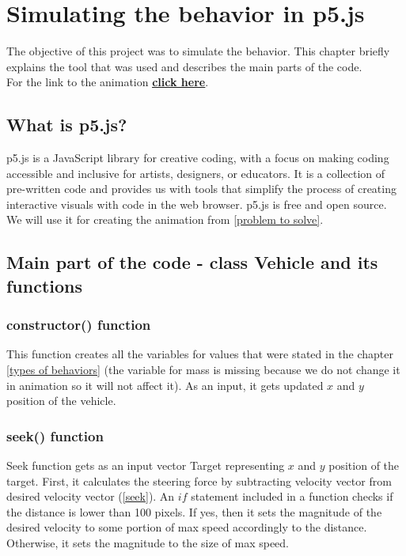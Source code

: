 \documentclass[10pt,twoside,english,a4paper]{article}
\begin{document}
\section{Simulating the behavior in p5.js} \label{simulation} 

The objective of this project was to simulate the behavior. This chapter briefly
explains the tool that was used and describes the main parts of the code.\\
For the link to the animation \textbf{\underline{\href{https://editor.p5js.org/RichardCernansky/sketches/E0zAXshWw}{click here}}}.

\subsection{What is p5.js?} \label{p5 char} 

p5.js is a JavaScript library for creative coding, with a focus on 
making coding accessible and inclusive for artists, designers, or 
educators. It is a collection of pre-written code and provides us 
with tools that simplify the process of creating interactive visuals 
with code in the web browser. p5.js is free and open source. We 
will use it for creating the animation from \ref{problem to solve}. 

\subsection{Main part of the code - class Vehicle and its functions} \label{class Vehicle} 

\subsubsection{constructor() function} \label{constructorf} 

This function creates all the variables for values that were stated in the 
chapter \ref{types of behaviors} (the variable for mass is missing because we do not change it in animation
so it will not affect it). As an input, it gets updated $x$ and $y$ position
of the vehicle. 

\subsubsection{seek() function} \label{seekf} 

Seek function gets as an input vector Target representing $x$ and $y$ position
of the target. First, it calculates the steering force by subtracting velocity vector
from desired velocity vector (\ref{seek}). An $if$ statement included in a function checks if 
the distance is lower than 100 pixels. If yes, then it sets the magnitude of the 
desired velocity to some portion of max speed accordingly to the distance. 
Otherwise, it sets the magnitude to the size of max speed.
\end{document}
